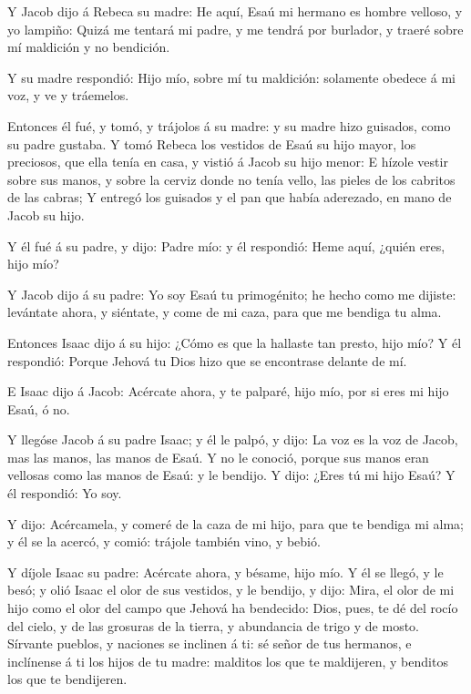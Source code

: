  Y Jacob dijo á Rebeca su madre: He aquí, Esaú mi hermano
es hombre velloso, y yo lampiño:  Quizá me tentará mi
padre, y me tendrá por burlador, y traeré sobre mí maldición y no
bendición.

 Y su madre respondió: Hijo mío, sobre mí tu maldición:
solamente obedece á mi voz, y ve y tráemelos.

 Entonces él fué, y tomó, y trájolos á su madre: y su madre
hizo guisados, como su padre gustaba.  Y tomó Rebeca los
vestidos de Esaú su hijo mayor, los preciosos, que ella tenía en casa, y
vistió á Jacob su hijo menor:  E hízole vestir sobre sus
manos, y sobre la cerviz donde no tenía vello, las pieles de los
cabritos de las cabras;  Y entregó los guisados y el pan
que había aderezado, en mano de Jacob su hijo.

 Y él fué á su padre, y dijo: Padre mío: y él respondió:
Heme aquí, ¿quién eres, hijo mío?

 Y Jacob dijo á su padre: Yo soy Esaú tu primogénito; he
hecho como me dijiste: levántate ahora, y siéntate, y come de mi caza,
para que me bendiga tu alma.

 Entonces Isaac dijo á su hijo: ¿Cómo es que la hallaste
tan presto, hijo mío? Y él respondió: Porque Jehová tu Dios hizo que se
encontrase delante de mí.

 E Isaac dijo á Jacob: Acércate ahora, y te palparé, hijo
mío, por si eres mi hijo Esaú, ó no.

 Y llegóse Jacob á su padre Isaac; y él le palpó, y dijo:
La voz es la voz de Jacob, mas las manos, las manos de Esaú.
 Y no le conoció, porque sus manos eran vellosas como las
manos de Esaú: y le bendijo.  Y dijo: ¿Eres tú mi hijo
Esaú? Y él respondió: Yo soy.

 Y dijo: Acércamela, y comeré de la caza de mi hijo, para
que te bendiga mi alma; y él se la acercó, y comió: trájole también
vino, y bebió.

 Y díjole Isaac su padre: Acércate ahora, y bésame, hijo
mío.  Y él se llegó, y le besó; y olió Isaac el olor de sus
vestidos, y le bendijo, y dijo: Mira, el olor de mi hijo como el olor
del campo que Jehová ha bendecido:  Dios, pues, te dé del
rocío del cielo, y de las grosuras de la tierra, y abundancia de trigo y
de mosto.  Sírvante pueblos, y naciones se inclinen á ti:
sé señor de tus hermanos, e inclínense á ti los hijos de tu madre:
malditos los que te maldijeren, y benditos los que te bendijeren.

